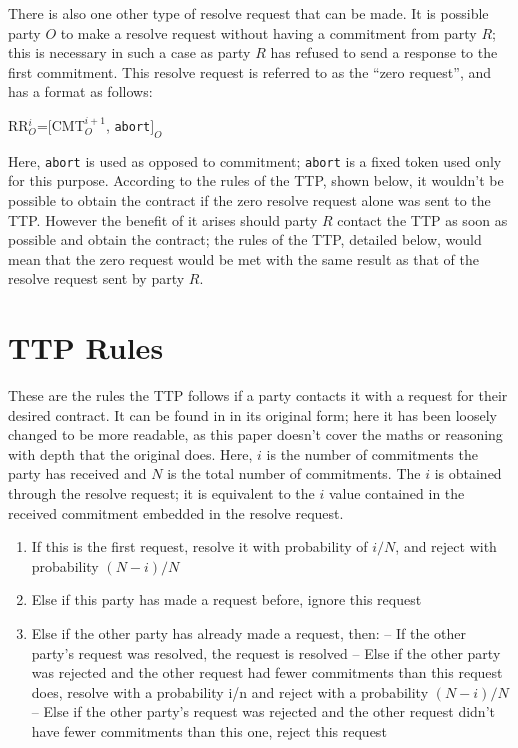 \documentclass{l4proj}
\begin{document}
There is also one other type of resolve request that can be made. It is possible party $O$ to make a resolve request without having a commitment from party $R$; this is necessary in such a case as party $R$ has refused to send a response to the first commitment. This resolve request is referred to as the ``zero request'', and has a format as follows:\\

\centerline{RR${_{O}^{i}}$=$[$CMT${_{O}^{i+1}}$, {\tt abort}$]_O$}

Here, {\tt abort} is used as opposed to commitment; {\tt abort} is a fixed token used only for this purpose. According to the rules of the TTP, shown below, it wouldn't be possible to obtain the contract if the zero resolve request alone was sent to the TTP. However the benefit of it arises should party $R$ contact the TTP as soon as possible and obtain the contract; the rules of the TTP, detailed below, would mean that the zero request would be met with the same result as that of the resolve request sent by party $R$.

\section{TTP Rules}
These are the rules the TTP follows if a party contacts it with a request for their desired contract. It can be found in \cite{ASW09} in its original form; here it has been loosely changed to be more readable, as this paper doesn't cover the maths or reasoning with depth that the original does. Here, $i$ is the number of commitments the party has received and $N$ is the total number of commitments. The $i$ is obtained through the resolve request; it is equivalent to the $i$ value contained in the received commitment embedded in the resolve request.

\begin{enumerate}
\item If this is the first request, resolve it with probability of $i/N$, and reject with probability $(N-i)/N$
\item Else if this party has made a request before, ignore this request
\item Else if the other party has already made a request, then:
\subitem-- If the other party's request was resolved, the request is resolved
\subitem-- Else if the other party was rejected and the other request had fewer commitments than this request does, resolve with a probability i/n and reject with a probability $(N-i)/N$
\subitem-- Else if the other party's request was rejected and the other request didn't have fewer commitments than this one, reject this request
\end{enumerate}
\end{document}
